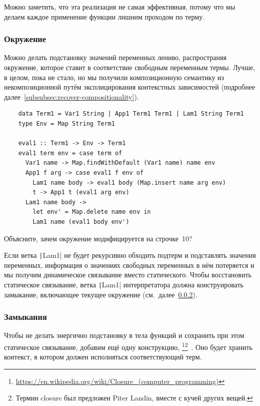 Можно заметить, что эта реализация не самая эффективная, потому что мы делаем каждое применение функции лишним проходом по терму.

\subsubsection{Окружение}

Можно делать подстановку значений переменных лениво, распространяя окружение, которое ставит в соответствие свободным переменным термы.
Лучше, в целом, пока не стало, но мы получили композиционную семантику из некомпозиционной путём эксплицирования контекстных зависимостей (подробнее далее~\ref{subsubsec:recover-compositionality}).

\begin{verbatim}
    data Term1 = Var1 String | App1 Term1 Term1 | Lam1 String Term1
    type Env = Map String Term1

    eval1 :: Term1 -> Env -> Term1
    eval1 term env = case term of
      Var1 name -> Map.findWithDefault (Var1 name) name env
      App1 f arg -> case eval1 f env of
        Lam1 name body -> eval1 body (Map.insert name arg env)
        t -> App1 t (eval1 arg env)
      Lam1 name body ->
        let env' = Map.delete name env in
        Lam1 name (eval1 body env')
\end{verbatim}

\begin{task}
    Объясните, зачем окружение модифицируется на строчке~10?
\end{task}

Если ветка \texttt|Lam1| не будет рекурсивно обходить подтерм и подставлять значения переменных, информация о значениях свободных переменных в нём потеряется и мы получим динамическое связывание вместо статического.
Чтобы восстановить статическое связывание, ветка \texttt|Lam1| интерпретатора должна конструировать замыкание, включающее текущее окружение (см.\ далее~\ref{subsubsec:closures}).

\subsubsection{Замыкания} \label{subsubsec:closures}

Чтобы не делать энергично подстановку в тела функций и сохранить при этом статическое связывание, добавим ещё одну конструкцию, \footnote{\url{https://en.wikipedia.org/wiki/Closure_(computer_programming)}}\footnote{Термин closure был предложен Piter Landin, вместе с кучей других вещей.}~\cite[глава 11]{nystrom2021crafting}.
Оно будет хранить контекст, в котором должен исполняться соответствующий терм.


